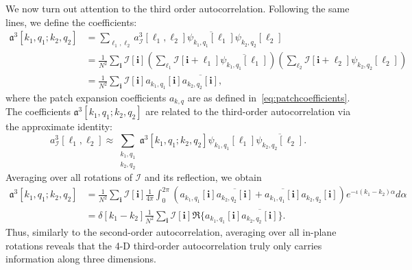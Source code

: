 \documentclass[12pt]{article}
\newcommand{\1}{\mathbf{1}}
\newcommand{\II}{\mathcal{I}}
\newcommand{\mb}{\mathbf}
\newcommand*\Bell{\ensuremath{\boldsymbol\ell}}
\theoremstyle{plain}
\theoremstyle{definition}
\theoremstyle{remark}
\theoremstyle{plain}
\theoremstyle{remark}
\theoremstyle{plain}
\theoremstyle{plain}
\begin{document}
We now turn out attention to the third order autocorrelation. Following the same lines, we define the coefficients:
\[\begin{aligned} \mathfrak{a}^3[k_1,q_1;k_2,q_2] &= \sum_{\Bell_1, \Bell_2} a^3_\II[\Bell_1,\Bell_2]\overline{\psi_{k_1,q_1}[\Bell_1]}\psi_{k_2,q_2}[\Bell_2]\\
&= \frac{1}{N^2}\sum_{\mb i}\II[\mb i]\left(\sum_{\Bell_1}\II[\mb i+\Bell_1]\overline{\psi_{k_1,q_1}[\Bell_1]}\right) \left(\sum_{\Bell_2}\II[\mb i+\Bell_2]\psi_{k_2,q_2}[\Bell_2]\right)\\
&= \frac{1}{N^2}\sum_{\mb i}\II[\mb i] a_{k_1,q_1}[\mb i]\overline{a_{k_2,q_2}[\mb i]},
\end{aligned}\]
where the patch expansion coefficients $a_{k,q}$ are as defined in~\eqref{eq:patchcoefficients}.
The coefficients $\mathfrak{a}^3[k_1,q_1;k_2,q_2]$ are related to the third-order autocorrelation via the approximate identity:
\[ a^3_\II[\Bell_1, \Bell_2] \approx \sum_{\substack{k_1,q_1\\ k_2,q_2}}\mathfrak{a}^3[k_1,q_1;k_2,q_2]\psi_{k_1,q_1}[\Bell_1]\overline{\psi_{k_2,q_2}[\Bell_2]}.\]
Averaging over all rotations of $\II$ and its reflection, we obtain
\begin{align} \label{eq:third_order_ac_pswf}
\mathfrak{a}^3[k_1,q_1;k_2,q_2] &= \frac{1}{N^2}\sum_{\mb i}\II[\mb i] \frac{1}{4\pi}\int_0^{2\pi}\left(a_{k_1,q_1}[\mb i]\overline{a_{k_2,q_2}[\mb i]} + \overline{a_{k_1,q_1}[\mb i]}a_{k_2,q_2}[\mb i]\right)e^{-\iota(k_1-k_2)\alpha}d\alpha \nonumber\\
&= \delta[k_1 - k_2]\frac{1}{N^2}\sum_{\mb i}\II[\mb i]\Re\{a_{k_1,q_1}[\mb i]\overline{a_{k_2,q_2}[\mb i]}\}. 
\end{align}
Thus, similarly to the second-order autocorrelation, averaging over all in-plane rotations reveals that the 4-D third-order autocorrelation truly only carries information along three dimensions.
\end{document}
